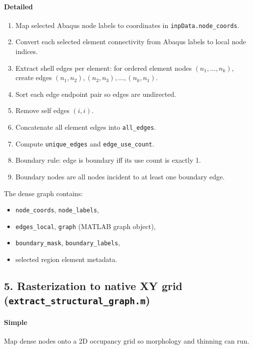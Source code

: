 \documentclass[11pt]{article}
\begin{document}
\paragraph{Detailed}
\begin{enumerate}
  \item Map selected Abaqus node labels to coordinates in \texttt{inpData.node\_coords}.
  \item Convert each selected element connectivity from Abaqus labels to local node indices.
  \item Extract shell edges per element:
  for ordered element nodes \((n_1,\dots,n_k)\), create edges
  \((n_1,n_2),(n_2,n_3),\dots,(n_k,n_1)\).
  \item Sort each edge endpoint pair so edges are undirected.
  \item Remove self edges \((i,i)\).
  \item Concatenate all element edges into \texttt{all\_edges}.
  \item Compute \texttt{unique\_edges} and \texttt{edge\_use\_count}.
  \item Boundary rule:
  edge is boundary iff its use count is exactly 1.
  \item Boundary nodes are all nodes incident to at least one boundary edge.
\end{enumerate}

The dense graph contains:
\begin{itemize}
  \item \texttt{node\_coords}, \texttt{node\_labels},
  \item \texttt{edges\_local}, \texttt{graph} (MATLAB graph object),
  \item \texttt{boundary\_mask}, \texttt{boundary\_labels},
  \item selected region element metadata.
\end{itemize}

\subsection*{5. Rasterization to native XY grid (\texttt{extract\_structural\_graph.m})}
\paragraph{Simple}
Map dense nodes onto a 2D occupancy grid so morphology and thinning can run.
\end{document}
